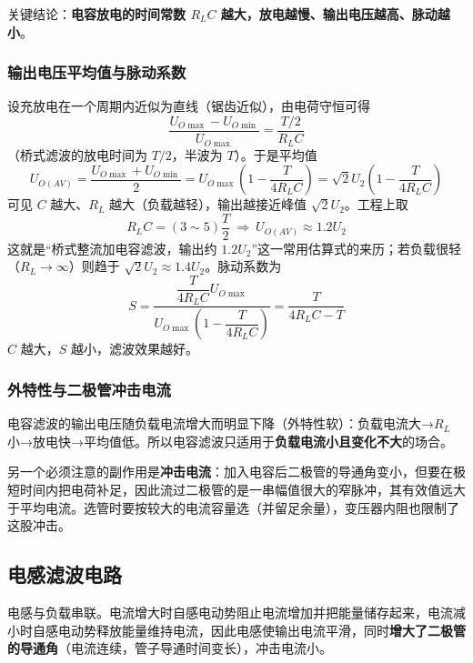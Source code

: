 关键结论：\textbf{电容放电的时间常数 $R_LC$ 越大，放电越慢、输出电压越高、脉动越小}。

\subsubsection{输出电压平均值与脉动系数}
设充放电在一个周期内近似为直线（锯齿近似），由电荷守恒可得
\begin{equation}
\frac{U_{O\max}-U_{O\min}}{U_{O\max}}=\frac{T/2}{R_LC}
\end{equation}
（桥式滤波的放电时间为 $T/2$，半波为 $T$）。于是平均值
\begin{equation}
U_{O(AV)}=\frac{U_{O\max}+U_{O\min}}{2}
=U_{O\max}\left(1-\frac{T}{4R_LC}\right)
=\sqrt2U_2\left(1-\frac{T}{4R_LC}\right)
\end{equation}
可见 $C$ 越大、$R_L$ 越大（负载越轻），输出越接近峰值 $\sqrt2U_2$。工程上取
\begin{equation}
R_LC=(3\sim5)\frac{T}{2}\ \Longrightarrow\ U_{O(AV)}\approx1.2U_2
\end{equation}
这就是“桥式整流加电容滤波，输出约 $1.2U_2$”这一常用估算式的来历；若负载很轻（$R_L\to\infty$）则趋于 $\sqrt2U_2\approx1.4U_2$。脉动系数为
\begin{equation}
S=\frac{\dfrac{T}{4R_LC}U_{O\max}}{U_{O\max}\left(1-\dfrac{T}{4R_LC}\right)}
=\frac{T}{4R_LC-T}
\end{equation}
$C$ 越大，$S$ 越小，滤波效果越好。

\subsubsection{外特性与二极管冲击电流}
电容滤波的输出电压随负载电流增大而明显下降（外特性软）：负载电流大→$R_L$ 小→放电快→平均值低。所以电容滤波只适用于\textbf{负载电流小且变化不大}的场合。

另一个必须注意的副作用是\textbf{冲击电流}：加入电容后二极管的导通角变小，但要在极短时间内把电荷补足，因此流过二极管的是一串幅值很大的窄脉冲，其有效值远大于平均电流。选管时要按较大的电流容量选（并留足余量），变压器内阻也限制了这股冲击。

\subsection{电感滤波电路}
电感与负载串联。电流增大时自感电动势阻止电流增加并把能量储存起来，电流减小时自感电动势释放能量维持电流，因此电感使输出电流平滑，同时\textbf{增大了二极管的导通角}（电流连续，管子导通时间变长），冲击电流小。

